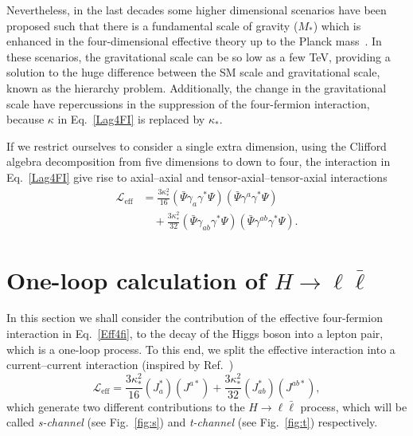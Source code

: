 \documentclass{ws-mpla}
\newcommand{\ga}{\gamma}
\newcommand{\Lag}{\mathscr{L}}
\renewcommand{\(}{\left(}
\renewcommand{\)}{\right)}
\renewcommand{\[}{\left[}
\renewcommand{\]}{\right]}
\begin{document}
Nevertheless, in the last decades some higher dimensional scenarios have been proposed such that there is a fundamental scale of gravity ($M_*$) which is enhanced in the four-dimensional effective theory up to the Planck mass~\cite{ADD1,AADD,ADD2,RS1,RS2}. In these scenarios, the gravitational scale can be so low as a few \si{\TeV}, providing a solution to the huge difference between the SM scale and gravitational scale, known as the hierarchy problem. Additionally, the change in the gravitational scale have repercussions in the suppression of the four-fermion interaction, because $\kappa$ in Eq.~\eqref{Lag4FI} is replaced by $\kappa_*$.

If we restrict ourselves to consider a single extra dimension, using the Clifford algebra decomposition from five dimensions to down to four, the interaction in Eq.~\eqref{Lag4FI} give rise to axial--axial and tensor-axial--tensor-axial interactions~\cite{Castillo-Felisola:2013jva}
\begin{equation}
  \begin{split}
    \Lag_{\text{eff}}
    & = \frac{3 \kappa_*^2}{16} \( \bar{\Psi} \ga_{a}\ga^* \Psi \) \( \bar{\Psi} \ga^{a}\ga^* \Psi \) \\
    & \quad + \frac{3 \kappa_*^2}{32} \( \bar{\Psi} \ga_{a b}\ga^* \Psi \) \( \bar{\Psi} \ga^{a b}\ga^* \Psi \).
  \end{split}
  \label{Eff4fi}
\end{equation}


\section{One-loop calculation of $H \to \ell \bar{\ell}$}\label{1loop}

In this section we shall consider the contribution of the effective four-fermion interaction in Eq.~\eqref{Eff4fi}, to the decay of the Higgs boson into a lepton pair, which is a one-loop process. To this end, we split the effective interaction into a current--current interaction (inspired by Ref.~)
\begin{equation}
  \Lag_{\text{eff}} = \frac{3 \kappa_*^2}{16} \( J_{a}^* \) \( J^{a*} \) + \frac{3 \kappa_*^2}{32} \( J_{ab}^* \) \( J^{ab*} \),
  \label{new4fi}
\end{equation}
which generate two different contributions to the $H \to \ell \bar{\ell}$ process, which will be called \emph{s-channel} (see Fig.~\ref{fig:s}) and \emph{t-channel} (see Fig.~\ref{fig:t}) respectively.
\end{document}
